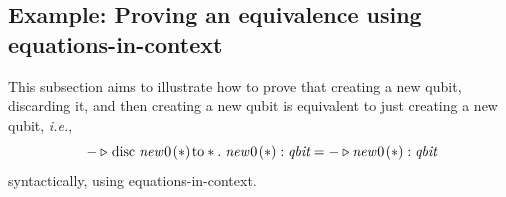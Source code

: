   \subsection{Example: Proving an equivalence using equations-in-context}

  This subsection aims to illustrate how to prove that creating a new qubit, discarding it, and then creating a new qubit is equivalent to just creating a new qubit, \textit{i.e.},
  \begin{equation}
    - \triangleright \hspace{1 pt} \text{disc} \hspace{3pt} \textit{new}\hspace{1pt}0 \hspace{1pt}(*) \hspace{1pt} \text{to} *. \hspace{3pt} \textit{new}\hspace{1pt}0 \hspace{1pt}(*): \textit{qbit} = - \triangleright \textit{new}\hspace{1pt}0 \hspace{1pt}(*): \textit{qbit} 
  \end{equation}
  syntactically, using equations-in-context.

